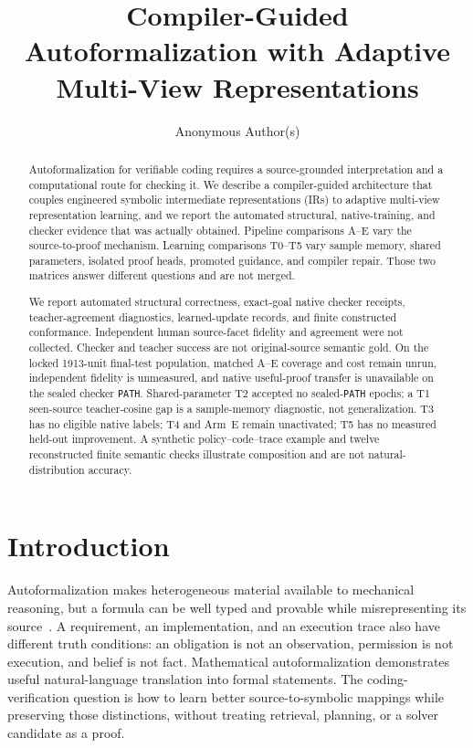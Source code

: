 \documentclass{article}
\title{Compiler-Guided Autoformalization with Adaptive\\Multi-View Representations}
\author{Anonymous Author(s)}
\begin{document}
\maketitle

\begin{abstract}
Autoformalization for verifiable coding requires a source-grounded interpretation and a computational route for checking it. We describe a compiler-guided architecture that couples engineered symbolic intermediate representations (IRs) to adaptive multi-view representation learning, and we report the automated structural, native-training, and checker evidence that was actually obtained. Pipeline comparisons A--E vary the source-to-proof mechanism. Learning comparisons T0--T5 vary sample memory, shared parameters, isolated proof heads, promoted guidance, and compiler repair. Those two matrices answer different questions and are not merged.

We report automated structural correctness, exact-goal native checker receipts, teacher-agreement diagnostics, learned-update records, and finite constructed conformance. Independent human source-facet fidelity and agreement were not collected. Checker and teacher success are not original-source semantic gold. On the locked 1913-unit final-test population, matched A--E coverage and cost remain unrun, independent fidelity is unmeasured, and native useful-proof transfer is unavailable on the sealed checker \texttt{PATH}. Shared-parameter T2 accepted no sealed-\texttt{PATH} epochs; a T1 seen-source teacher-cosine gap is a sample-memory diagnostic, not generalization. T3 has no eligible native labels; T4 and Arm~E remain unactivated; T5 has no measured held-out improvement. A synthetic policy--code--trace example and twelve reconstructed finite semantic checks illustrate composition and are not natural-distribution accuracy.
\end{abstract}

\section{Introduction}
Autoformalization makes heterogeneous material available to mechanical reasoning, but a formula can be well typed and provable while misrepresenting its source~\citep{wu2022autoformalization,azerbayev2023proofnet,jiang2024multilanguage}. A requirement, an implementation, and an execution trace also have different truth conditions: an obligation is not an observation, permission is not execution, and belief is not fact. Mathematical autoformalization demonstrates useful natural-language translation into formal statements. The coding-verification question is how to learn better source-to-symbolic mappings while preserving those distinctions, without treating retrieval, planning, or a solver candidate as a proof.
\end{document}
